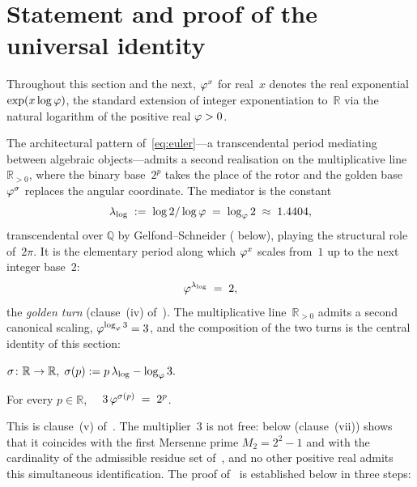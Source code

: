 \section{Statement and proof of the universal identity}
\label{sec:universal}

Throughout this section and the next, $\varphi^{x}$ for real~$x$
denotes the real exponential $\exp(x\log\varphi)$, the standard
extension of integer exponentiation to~$\mathbb{R}$ via the natural
logarithm of the positive real $\varphi>0$.

The architectural pattern of~\eqref{eq:euler}---a transcendental
period mediating between algebraic objects---admits a second
realisation on the multiplicative line~$\mathbb{R}_{>0}$, where the
binary base~$2^{p}$ takes the place of the rotor and the golden base
$\varphi^{\sigma}$ replaces the angular coordinate.  The mediator is
the constant
\[
  \lambda_{\log} \;:=\; \log 2/\log\varphi
                  \;=\; \log_{\varphi} 2 \;\approx\; 1.4404,
\]
transcendental over $\mathbb{Q}$ by Gelfond--Schneider
( below), playing the structural role
of~$2\pi$.  It is the elementary period along which $\varphi^{x}$
scales from~$1$ up to the next integer base~$2$:
\begin{equation}\label{eq:golden-turn}
  \varphi^{\lambda_{\log}} \;=\; 2,
\end{equation}
the \emph{golden turn} (clause~(iv) of~).
The multiplicative line~$\mathbb{R}_{>0}$ admits a second canonical
scaling, $\varphi^{\log_{\varphi} 3} = 3$, and the composition of the
two turns is the central identity of this section:

\begin{Definition}\label{def:sigma}
$\sigma\colon\mathbb{R}\to\mathbb{R},\;\sigma(p):=p\,\lambda_{\log}-\log_{\varphi}3.$
\end{Definition}

\begin{Theorem}\label{thm:universal}
For every $p\in\mathbb{R}$, $\quad 3\,\varphi^{\sigma(p)} \;=\; 2^{p}$.
\end{Theorem}

\noindent This is clause~(v) of~.  The
multiplier~$3$ is not free:  below
(clause~(vii)) shows that it coincides with the first Mersenne prime $M_{2}=2^{2}-1$ and with the cardinality of the admissible residue set
of~, and no other positive real admits
this simultaneous identification.  The proof of~
is established below in three steps:

